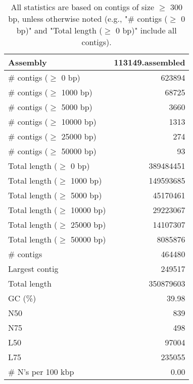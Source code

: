 \documentclass[12pt,a4paper]{article}
\begin{document}
\begin{table}[ht]
\begin{center}
\caption{All statistics are based on contigs of size $\geq$ 300 bp, unless otherwise noted (e.g., "\# contigs ($\geq$ 0 bp)" and "Total length ($\geq$ 0 bp)" include all contigs).}
\begin{tabular}{|l*{1}{|r}|}
\hline
Assembly & 113149.assembled \\ \hline
\# contigs ($\geq$ 0 bp) & 623894 \\ \hline
\# contigs ($\geq$ 1000 bp) & 68725 \\ \hline
\# contigs ($\geq$ 5000 bp) & 3660 \\ \hline
\# contigs ($\geq$ 10000 bp) & 1313 \\ \hline
\# contigs ($\geq$ 25000 bp) & 274 \\ \hline
\# contigs ($\geq$ 50000 bp) & 93 \\ \hline
Total length ($\geq$ 0 bp) & 389484451 \\ \hline
Total length ($\geq$ 1000 bp) & 149593685 \\ \hline
Total length ($\geq$ 5000 bp) & 45170461 \\ \hline
Total length ($\geq$ 10000 bp) & 29223067 \\ \hline
Total length ($\geq$ 25000 bp) & 14107307 \\ \hline
Total length ($\geq$ 50000 bp) & 8085876 \\ \hline
\# contigs & 464480 \\ \hline
Largest contig & 249517 \\ \hline
Total length & 350879603 \\ \hline
GC (\%) & 39.98 \\ \hline
N50 & 839 \\ \hline
N75 & 498 \\ \hline
L50 & 97004 \\ \hline
L75 & 235055 \\ \hline
\# N's per 100 kbp & 0.00 \\ \hline
\end{tabular}
\end{center}
\end{table}
\end{document}
